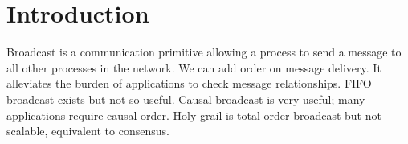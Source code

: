 
\section{Introduction}

Broadcast is a communication primitive allowing a process to send a message to
all other processes in the network. We can add order on message delivery. It
alleviates the burden of applications to check message relationships. FIFO
broadcast exists but not so useful. Causal broadcast is very useful; many
applications require causal order. Holy grail is total order broadcast but not
scalable, equivalent to consensus.


